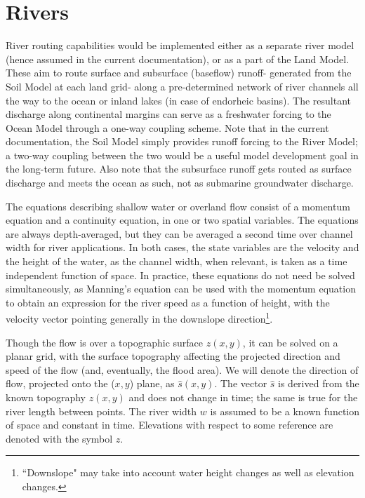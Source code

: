 \documentclass[twoside,10pt]{report}
\begin{document}
\chapter{Rivers}\label{c:rivers}
River routing capabilities would be implemented either as a separate river model (hence assumed in the current documentation), or as a part of the Land Model. These aim to route surface and subsurface (baseflow) runoff- generated from the Soil Model at each land grid- along a pre-determined network of river channels all the way to the ocean or inland lakes (in case of endorheic basins). The resultant discharge along continental margins can serve as a freshwater forcing to the Ocean Model through a one-way coupling scheme. Note that in the current documentation, the Soil Model simply provides runoff forcing to the River Model; a two-way coupling between the two would be a useful model development goal in the long-term future. Also note that the subsurface runoff gets routed as surface discharge and meets the ocean as such, not as submarine groundwater discharge.   

The equations describing shallow water or overland flow consist of a momentum equation and a continuity equation, in one or two spatial variables. The equations are always depth-averaged, but they can be averaged a second time over channel width for river applications. In both cases, the state variables are the velocity and the height of the water, as the channel width, when relevant, is taken as a time independent function of space. In practice, these equations do not need be solved simultaneously, as Manning's equation can be used with the momentum equation to obtain an expression for the river speed as a function of height, with the velocity vector pointing generally in the downslope direction\footnote{``Downslope" may take into account water height changes as well as elevation changes.}. 



Though the flow is over a topographic surface $z(x,y)$, it can be solved on a planar grid, with the surface topography affecting the projected direction and speed of the flow (and, eventually, the flood area). We will denote the direction of flow, projected onto the ($x,y$) plane, as $\hat{s}(x,y)$. The vector $\hat{s}$ is derived from the known topography $z(x,y)$ and does not change in time; the same is true for the river length between points. The river width $w$ is assumed to be a known function of space and constant in time. Elevations with respect to some reference are denoted with the symbol $z$.
\end{document}
